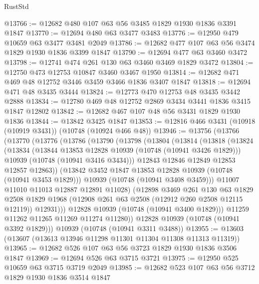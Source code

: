 \begin{lexlean}{RustStd}
\begin{coremodule}
{\begin{coremodule}
{{{{{@13766 := @12682 @480 @107 @63 @56 @3485 @1829 @1930 @1836 @3391 @1847
@13770 := @12694 @480 @63 @3477 @3483
@13776 := @12950 @479 @10659 @63 @3477 @3481 @2049
@13786 := @12682 @477 @107 @63 @56 @3474 @1829 @1930 @1836 @3399 @1847
@13790 := @12694 @477 @63 @3460 @3472
@13798 := @12741 @474 @261 @130 @63 @3460 @3469 @1829 @3472
@13804 := @12750 @473 @12753 @10847 @3460 @3467 @1950
@13814 := @12682 @471 @469 @48 @12752 @3446 @3459 @3466 @1836 @3407 @1847
@13818 := @12694 @471 @48 @3435 @3444
@13824 := @12773 @470 @12753 @48 @3435 @3442 @2888
@13834 := @12780 @469 @48 @12752 @2869 @3434 @3441 @1836 @3415 @1847 @12802
@13842 := @12682 @467 @107 @48 @56 @3431 @1829 @1930 @1836
@13844 := @13842 @3425 @1847
@13853 := @12816 @466 @3431 (@10918 (@10919 @3431)) (@10748 (@10924 @466 @48))
@13946 := @13756
    (@13766
      (@13770
        (@13776
          (@13786
            (@13790
              (@13798
                (@13804
                  (@13814
                    (@13818
                      (@13824
                        (@13834
                          (@13844 @13853 @12828 @10939 (@10748 (@10941 @3426 @1829)))
                          @10939
                          (@10748 (@10941 @3416 @3434)))
                        @12843
                        @12846
                        @12849
                        @12853
                        @12857
                        @12863))
                    (@13842 @3452 @1847 @13853 @12828 @10939 (@10748 (@10941 @3453 @1829)))
                    @10939
                    (@10748 (@10941 @3408 @3459)))
                  @11007
                  @11010
                  @11013
                  @12887
                  @12891
                  @11028)
                (@12898
                  @3469
                  @261
                  @130
                  @63
                  @1829
                  @2508
                  @1829
                  @1968
                  (@12908 @261 @63 @2508 (@12912 @260 @2508 @12115 @12119))
                  @12931)))
            @12828
            @10939
            (@10748 (@10941 @3400 @1829)))
          @11259
          @11262
          @11265
          @11269
          @11274
          @11280))
      @12828
      @10939
      (@10748 (@10941 @3392 @1829)))
    @10939
    (@10748 (@10941 @3311 @3488))
@13955 := @13603 (@13607 (@13613 @13946 @11298 @11301 @11304 @11308 @11313 @11319))
@13965 := @12682 @526 @107 @63 @56 @3723 @1829 @1930 @1836 @3506 @1847
@13969 := @12694 @526 @63 @3715 @3721
@13975 := @12950 @525 @10659 @63 @3715 @3719 @2049
@13985 := @12682 @523 @107 @63 @56 @3712 @1829 @1930 @1836 @3514 @1847
}}}}}
\end{coremodule}}
\end{coremodule}
\end{lexlean}
